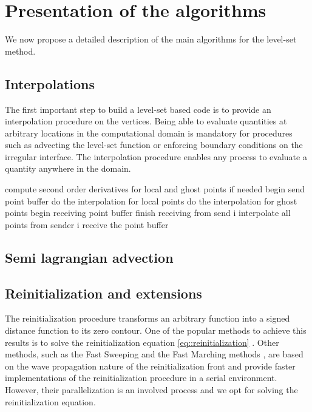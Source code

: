 \section{Presentation of the algorithms}

We now propose a detailed description of the main algorithms for the level-set method.

\subsection{Interpolations}

The first important step to build a level-set based code is to provide an interpolation procedure on the vertices. Being able to evaluate quantities at arbitrary locations in the computational domain is mandatory for procedures such as advecting the level-set function or enforcing boundary conditions on the irregular interface. The interpolation procedure enables any process to evaluate a quantity anywhere in the domain.

\begin{algorithm}[ht!]
\begin{algorithmic}
	\State compute second order derivatives for local and ghost points if needed
\EndIf
\State begin send point buffer
\State do the interpolation for local points
\State do the interpolation for ghost points
\State begin receiving point buffer
	\State finish receiving from send i
	\State interpolate all points from sender i
\EndFor
\State receive the point buffer
\end{algorithmic}
\end{algorithm}

\subsection{Semi lagrangian advection}

\subsection{Reinitialization and extensions} \label{section::reinitialization}

The reinitialization procedure transforms an arbitrary function into a signed distance function to its zero contour. One of the popular methods to achieve this results is to solve the reinitialization equation \ref{eq::reinitialization} \cite{Sussman:1994:levelsetincompressible, Min_Gibou:2007:Level_Set_Adaptive}. Other methods, such as the Fast Sweeping \cite{??} and the Fast Marching methods \cite{Sethian:1996:FMM, chopp:2001:fmm}, are based on the wave propagation nature of the reinitialization front and provide faster implementations of the reinitialization procedure in a serial environment. However, their parallelization is an involved process and we opt for solving the reinitialization equation.

